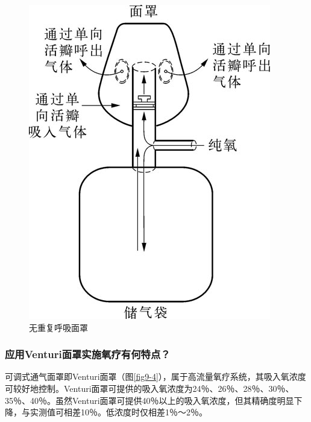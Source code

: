 \begin{figure}[!htbp]
 \centering
 \includegraphics{./images/Image00073.jpg}
 \captionsetup{justification=centering}
 \caption{无重复呼吸面罩}
 \label{fig9-3}
  \end{figure} 

\subsubsection{应用Venturi面罩实施氧疗有何特点？}

可调式通气面罩即Venturi面罩（图\ref{fig9-4}），属于高流量氧疗系统，其吸入氧浓度可较好地控制。Venturi面罩可提供的吸入氧浓度为24％、26％、28％、30％、35％、40％。虽然Venturi面罩可提供40％以上的吸入氧浓度，但其精确度明显下降，与实测值可相差10％。低浓度时仅相差1％～2％。

